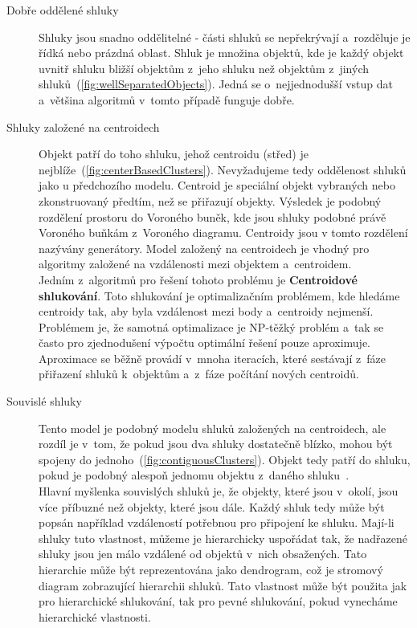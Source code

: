 \begin{description}
\item[Dobře oddělené shluky] Shluky jsou snadno oddělitelné - části shluků se ne\-pře\-krý\-va\-jí a~rozděluje je řídká nebo prázdná oblast. Shluk je množina objektů, kde je každý objekt uvnitř shluku bližší objektům z~jeho shluku než objektům z~jiných shluků~(\autoref{fig:wellSeparatedObjects}). Jedná se o~nejjednodušší vstup dat a~většina algoritmů v~tomto případě funguje dobře.

\item[Shluky založené na centroidech] Objekt patří do toho shluku, jehož centroidu (střed) je nejblíže~(\autoref{fig:centerBasedClusters}). Nevyžadujeme tedy oddělenost shluků jako u předchozího modelu. Centroid je speciální objekt vybraných nebo zkonstruovaný předtím, než se přiřazují objekty. Výsledek je podobný rozdělení prostoru do Voroného buněk, kde jsou shluky podobné právě Voroného buňkám z~Voroného diagramu. Centroidy jsou v tomto rozdělení nazývány generátory. Model založený na centroidech je vhodný pro algoritmy založené na vzdálenosti mezi objektem a~centroidem.\\

Jedním z~algoritmů pro řešení tohoto problému je \textbf{Centroidové shlukování}. Toto shlukování je optimalizačním problémem, kde hledáme centroidy tak, aby byla vzdálenost mezi body a~centroidy nejmenší. Problémem je, že samotná optimalizace je NP-těžký problém a~tak se často pro zjednodušení výpočtu optimální řešení pouze aproximuje. Aproximace se běžně provádí v~mnoha iteracích, které sestávají z~fáze přiřazení shluků k~objektům a~z~fáze počítání nových centroidů.

\item[Souvislé shluky] Tento model je podobný modelu shluků založených na centroidech, ale rozdíl je v~tom, že pokud jsou dva shluky dostatečně blízko, mohou být spojeny do jednoho~(\autoref{fig:contiguousClusters}). Objekt tedy patří do shluku, pokud je podobný alespoň jednomu objektu z~daného shluku~\cite{Tan05}. \\

Hlavní myšlenka souvislých shluků je, že objekty, které jsou v~okolí, jsou více příbuzné než objekty, které jsou dále. Každý shluk tedy může být popsán například vzdáleností potřebnou pro připojení ke shluku. Mají-li shluky tuto vlastnost, můžeme je hierarchicky uspořádat tak, že nadřazené shluky jsou jen málo vzdálené od objektů v~nich obsažených. Tato hierarchie může být reprezentována jako dendrogram, což je stromový diagram zobrazující hierarchii shluků. Tato vlastnost může být použita jak pro hierarchické shlukování, tak pro pevné shlukování, pokud vynecháme hierarchické vlastnosti. \\


\end{description}
